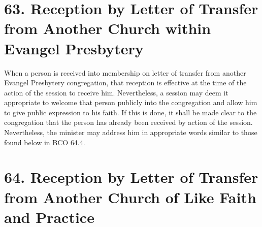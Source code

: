 \documentclass[
]{book}
\begin{document}
\hypertarget{reception-by-letter-of-transfer-from-another-church-within-evangel-presbytery}{%
\section*{63. Reception by Letter of Transfer from Another Church within Evangel Presbytery}\label{reception-by-letter-of-transfer-from-another-church-within-evangel-presbytery}}

\protect\hypertarget{chapter-slug-63-reception-by-letter-of-transfer-from-another-church-within-evangel-presbytery}{\href{}{}}

\protect\hypertarget{63}{\href{}{}}When a person is received into membership on letter of transfer from another Evangel Presbytery congregation, that reception is effective at the time of the action of the session to receive him. Nevertheless, a session may deem it appropriate to welcome that person publicly into the congregation and allow him to give public expression to his faith. If this is done, it shall be made clear to the congregation that the person has already been received by action of the session. Nevertheless, the minister may address him in appropriate words similar to those found below in BCO \protect\hyperlink{64.4}{64.4}.

\hypertarget{reception-by-letter-of-transfer-from-another-church-of-like-faith-and-practice}{%
\section*{64. Reception by Letter of Transfer from Another Church of Like Faith and Practice}\label{reception-by-letter-of-transfer-from-another-church-of-like-faith-and-practice}}

\protect\hypertarget{chapter-slug-64-reception-by-letter-of-transfer-from-another-church-of-like-faith-and-practice}{\href{}{}}
\end{document}
